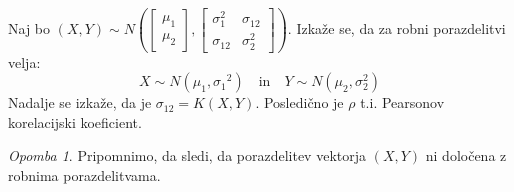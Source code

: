\documentclass[12pt]{book}
\def\n{\noindent}
\theoremstyle{definition}
\theoremstyle{plain}
\theoremstyle{plain}
\theoremstyle{plain}
\theoremstyle{plain}
\theoremstyle{remark}
\newtheorem*{opomba}{Opomba}
\begin{document}
%        
%        
%
%
%

\n Naj bo $(X,Y) \sim N\left(\begin{bmatrix} \mu_1 \\ \mu_2 \end{bmatrix},\begin{bmatrix} \sigma_1^2 & \sigma_{12} \\ \sigma_{12} & \sigma_2^2 \end{bmatrix}\right)$. Izkaže se, da za robni porazdelitvi velja: 
$$
X \sim N\left(\mu_1, \sigma_1{ }^2\right) \quad \text {in} \quad Y \sim N\left(\mu_2, \sigma_2^2\right)
$$
Nadalje se izkaže, da je $\sigma_{1 2}=K(X, Y)$. Posledično je $\rho$ t.i. Pearsonov korelacijski koeficient. 

\begin{opomba}
    Pripomnimo, da sledi, da porazdelitev vektorja $(X,Y)$ ni določena z robnima porazdelitvama. 
\end{opomba}
\end{document}
